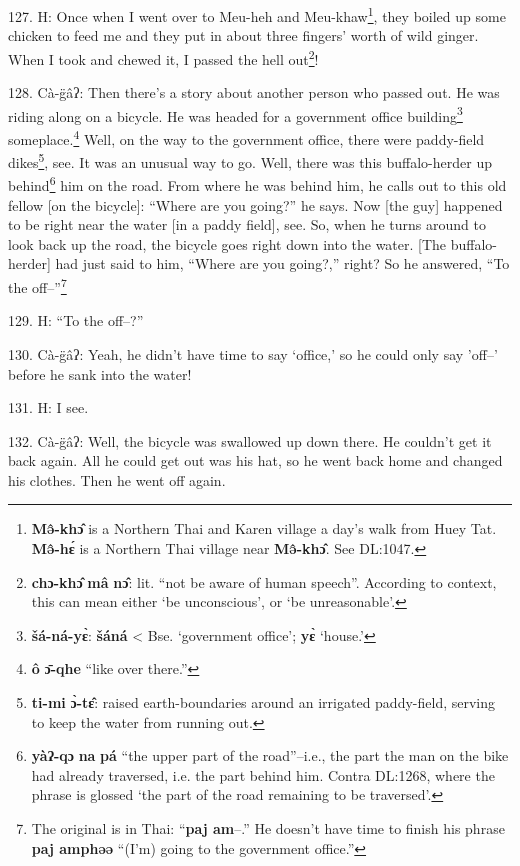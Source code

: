 127. H: Once when I went over to Meu-heh and Meu-khaw\footnote{\textbf{Mə̂-khɔ̂} is a Northern Thai and Karen village a day's walk from Huey Tat. \textbf{Mə̂-hɛ́} is a Northern Thai village near \textbf{Mə̂-khɔ̂}. See DL:1047.}, they boiled up some
chicken to feed me and they put in about three fingers' worth of wild ginger. When
I took and chewed it, I passed the hell out\footnote{\textbf{chɔ-khɔ̂} \textbf{mâ} \textbf{nɔ̂}: lit. ``not be aware of human speech''. According to context, this can mean either `be unconscious', or `be unreasonable'.}!

\begin{center}
\end{center}

128. Cà-g̈âʔ: Then there's a story about another person who passed out. He was
riding along on a bicycle. He was headed for a government office building\footnote{\textbf{šá-ná-yɛ̀}: \textbf{šáná} < Bse. `government office'; \textbf{yɛ̀} `house.'}
someplace.\footnote{\textbf{ô} \textbf{ɔ̄-qhe} ``like over there.''} Well, on the way to the government office, there were paddy-field
dikes\footnote{\textbf{ti-mi} \textbf{ɔ̀-tɛ̂}: raised earth-boundaries around an irrigated paddy-field, serving to keep the water from running out.}, see. It was an unusual way to go. Well, there was this buffalo-herder
up behind\footnote{\textbf{yàʔ-qɔ} \textbf{na} \textbf{pá} ``the upper part of the road''--i.e., the part the man on the bike had already traversed, i.e. the part behind him. Contra DL:1268, where the phrase is glossed `the part of the road remaining to be traversed'.} him on the road. From where he was behind him, he calls out to this
old fellow [on the bicycle]: ``Where are you going?'' he says.
Now [the guy] happened to be right near the water [in a paddy field], see. So,
when he turns around to look back up the road, the bicycle goes right down into
the water. [The buffalo-herder] had just said to him, ``Where are you going?,''
right? So he answered, ``To the off--''\footnote{The original is in Thai: ``\textbf{paj am}--.'' He doesn't have time to finish his phrase \textbf{paj amphəə} ``(I'm) going to the government office.''}

129. H: ``To the off--?''

130. Cà-g̈âʔ: Yeah, he didn't have time to say `office,' so he could only say
'off--' before he sank into the water!

131. H: I see.

132. Cà-g̈âʔ: Well, the bicycle was swallowed up down there. He couldn't get
it back again. All he could get out was his hat, so he went back home and changed
his clothes. Then he went off again.

